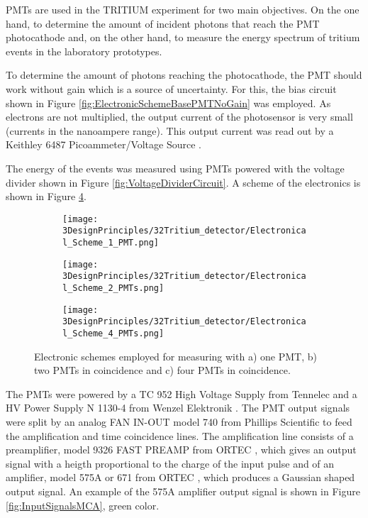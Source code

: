 PMTs are used in the TRITIUM experiment for two main objectives. On the one hand, to determine the amount of incident photons that reach the PMT photocathode and, on the other hand, to measure the energy spectrum of tritium events in the laboratory prototypes.

To determine the amount of photons reaching the photocathode, the PMT should work without gain which is a source of uncertainty. For this, the bias circuit shown in Figure \ref{fig:ElectronicSchemeBasePMTNoGain} was employed. As electrons are not multiplied, the output current of the photosensor is very small (currents in the nanoampere range). This output current was read out by a Keithley 6487 Picoammeter/Voltage Source \cite{DataSheetKeithley6487}. 

The energy of the events was measured using PMTs powered with the voltage divider shown in Figure \ref{fig:VoltageDividerCircuit}. A scheme of the electronics is shown in Figure \ref{fig:ElectronicConfiguraitonsPMT}.
\begin{figure}
\centering
    \begin{subfigure}[b]{1.0\textwidth}
    \centering
    \texttt{[image: 3DesignPrinciples/32Tritium\_detector/Electronical\_Scheme\_1\_PMT.png]}  
    \caption{\label{subfig:ElectronicConfiguraiton1PMT}}
    \end{subfigure}
    \hfill
    \begin{subfigure}[b]{1.0\textwidth}
    \centering
    \texttt{[image: 3DesignPrinciples/32Tritium\_detector/Electronical\_Scheme\_2\_PMTs.png]}  
    \caption{\label{subfig:ElectronicConfiguraiton2PMT}}
    \end{subfigure}
    \hfill
    \begin{subfigure}[b]{1.0\textwidth}
    \centering
    \texttt{[image: 3DesignPrinciples/32Tritium\_detector/Electronical\_Scheme\_4\_PMTs.png]}  
    \caption{\label{subfig:ElectronicConfiguraiton4PMT}}
    \end{subfigure}
 \caption{Electronic schemes employed for measuring with a) one PMT, b) two PMTs in coincidence and c) four PMTs in coincidence.}
 \label{fig:ElectronicConfiguraitonsPMT}
\end{figure}
The PMTs were powered by a TC 952 High Voltage Supply from Tennelec \cite{DataSheetHVSupplyTennelec} and a HV Power Supply N 1130-4 from Wenzel Elektronik \cite{DataSheetHVSupplyWenzel}. The PMT output signals were split by an analog FAN IN-OUT model 740 from Phillips Scientific \cite{DataSheetFANINOUT} to feed the amplification and time coincidence lines. The amplification line consists of a preamplifier, model 9326 FAST PREAMP from ORTEC \cite{DataSheetPreAmp}, which gives an output signal with a heigth proportional to the charge of the input pulse and of an amplifier, model 575A or 671 from ORTEC \cite{DataSheet575Amp, DataSheet671Amp}, which produces a Gaussian shaped output signal. An example of the 575A amplifier output signal is shown in Figure \ref{fig:InputSignalsMCA}, green color. 

